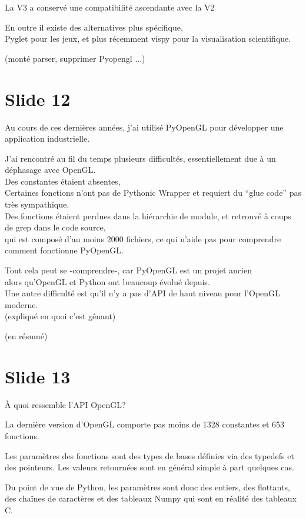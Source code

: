 \documentclass[12pt]{article}
\begin{document}
La V3 a conservé une compatibilité ascendante avec la V2

En outre il existe des alternatives plus spécifique, \\
Pyglet pour les jeux, et plus récemment vispy pour la visualisation scientifique.

(monté parser, supprimer Pyopengl ...)

\section{Slide 12}

Au cours de ces dernières années, j'ai utilisé PyOpenGL pour développer une application
industrielle.

J'ai rencontré au fil du temps plusieurs difficultés, essentiellement due à un déphasage avec OpenGL. \\
Des constantes étaient absentes, \\
Certaines fonctions n'ont pas de Pythonic Wrapper et requiert du ``glue code'' pas très sympathique. \\
Des fonctions étaient perdues dans la hiérarchie de module, et retrouvé à coups de grep dans le code source, \\
qui est composé d'au moins 2000 fichiers, ce qui n'aide pas pour comprendre comment fonctionne PyOpenGL.

Tout cela peut se -comprendre-, car PyOpenGL est un projet ancien \\
alors qu'OpenGL et Python ont beaucoup évolué depuis. \\
Une autre difficulté est qu'il n'y a pas d'API de haut niveau pour l'OpenGL moderne. \\
(expliqué en quoi c'est gênant)

(en résumé)

\section{Slide 13}

À quoi ressemble l'API OpenGL?

La dernière version d'OpenGL comporte pas moins de 1328 constantes et 653 fonctions.

Les paramètres des fonctions sont des types de bases définies via des typedefs et des
pointeurs. Les valeurs retournées sont en général simple à part quelques cas.

Du point de vue de Python, les paramètres sont donc des entiers, des flottants, des chaînes de
caractères et des tableaux Numpy qui sont en réalité des tableaux C. %
\end{document}

